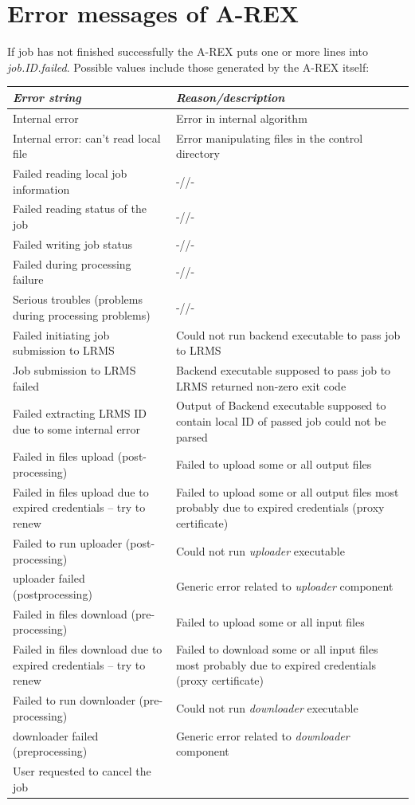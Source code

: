 \documentclass{article}                            %
\begin{document}
\section{Error messages of A-REX\label{annex:arex-errors}}

If job has not finished successfully the A-REX puts one or more lines
into \textit{job.ID.failed}. Possible values include those generated
by the A-REX itself:\\
\begin{longtable}{|p{5cm}|p{10cm}|}
\hline 
\emph{Error string}&
\emph{Reason/description}\tabularnewline
\hline 
Internal error&
Error in internal algorithm\tabularnewline
\hline 
Internal error: can't read local file&
Error manipulating files in the control directory\tabularnewline
\hline 
Failed reading local job information&
-//-\tabularnewline
\hline 
Failed reading status of the job&
-//-\tabularnewline
\hline 
Failed writing job status&
-//-\tabularnewline
\hline 
Failed during processing failure&
-//-\tabularnewline
\hline 
Serious troubles (problems during processing problems)&
-//-\tabularnewline
\hline 
Failed initiating job submission to LRMS&
Could not run backend executable to pass job to LRMS\tabularnewline
\hline 
Job submission to LRMS failed&
Backend executable supposed to pass job to LRMS returned non-zero
exit code\tabularnewline
\hline 
Failed extracting LRMS ID due to some internal error&
Output of Backend executable supposed to contain local ID of passed
job could not be parsed\tabularnewline
\hline 
Failed in files upload (post-processing)&
Failed to upload some or all output files\tabularnewline
\hline 
Failed in files upload due to expired credentials -- try to renew&
Failed to upload some or all output files most probably due to expired
credentials (proxy certificate)\tabularnewline
\hline 
Failed to run uploader (post-processing)&
Could not run \emph{uploader} executable\tabularnewline
\hline 
uploader failed (postprocessing)&
Generic error related to \emph{uploader} component\tabularnewline
\hline 
Failed in files download (pre-processing)&
Failed to upload some or all input files\tabularnewline
\hline 
Failed in files download due to expired credentials -- try to renew&
Failed to download some or all input files most probably due to expired
credentials (proxy certificate)\tabularnewline
\hline 
Failed to run downloader (pre-processing)&
Could not run \emph{downloader} executable\tabularnewline
\hline
downloader failed (preprocessing)&
Generic error related to \emph{downloader} component\tabularnewline
\hline
User requested to cancel the job&

\end{longtable}
\end{document}
